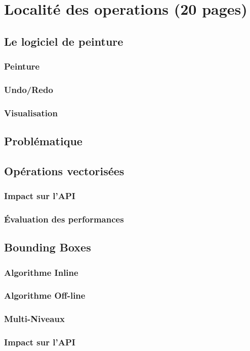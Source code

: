\chapter{Localité des operations (20 pages)}
	\section{Le logiciel de peinture}
		\subsection{Peinture}
		\subsection{Undo/Redo}
		\subsection{Visualisation}
	\section{Problématique}
	\section{Opérations vectorisées}
		\subsection{Impact sur l'API}
		\subsection{Évaluation des performances}
	\section{Bounding Boxes}
		\subsection{Algorithme Inline}
		\subsection{Algorithme Off-line}
		\subsection{Multi-Niveaux}
		\subsection{Impact sur l'API}
